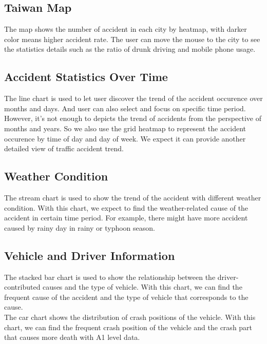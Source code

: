 \documentclass[a4paper, oneside, final, 12pt]{scrartcl} %
\begin{document}
\subsection{Taiwan Map}

The map shows the number of accident in each city
by heatmap, with darker color means higher accident rate.
The user can move the mouse to the city to see the statistics details
such as the ratio of drunk driving and mobile phone usage.

\subsection{Accident Statistics Over Time}

The line chart is used to let user discover the trend of the accident occurence
over months and days. And user can also select and focus on specific time period.
However, it's not enough to depicts the trend of accidents 
from the perspective of months and years.
So we also use the grid heatmap to represent 
the accident occurence by time of day and day of week.
We expect it can provide another detailed view of traffic accident trend.

\subsection{Weather Condition}

The stream chart is used to show the trend of the accident with different weather condition.
With this chart, we expect to find the weather-related cause of the accident in certain time period.
For example, there might have more accident caused by rainy day in rainy or typhoon season.

\subsection{Vehicle and Driver Information}

The stacked bar chart is used to show the relationship between the driver-contributed causes
and the type of vehicle. With this chart, we can find the frequent cause of the accident
and the type of vehicle that corresponds to the cause. \\

The car chart shows the distribution of crash positions of the vehicle.
With this chart, we can find the frequent crash position of the vehicle
and the crash part that causes more death with A1 level data.

\endgroup

\end{document}

